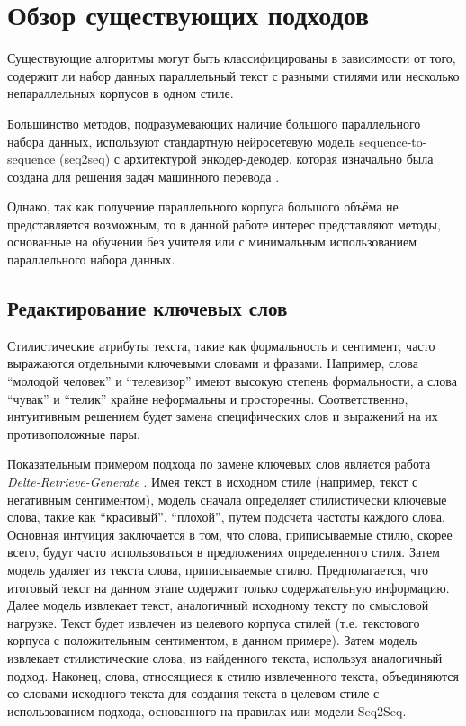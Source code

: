 \section{Обзор существующих подходов} \label{cha:analysis:sec:methods}
Существующие алгоритмы могут быть классифицированы в зависимости от того, содержит ли набор данных параллельный текст с разными стилями или несколько непараллельных корпусов в одном стиле.

Большинство методов, подразумевающих наличие большого параллельного набора данных, используют стандартную нейросетевую модель sequence-to-sequence (seq2seq) с архитектурой энкодер-декодер, которая изначально была создана для решения задач машинного перевода \cite{jin2021deep}.

Однако, так как получение параллельного корпуса большого объёма не представляется возможным, то в данной работе интерес представляют методы, основанные на обучении без учителя или с минимальным использованием параллельного набора данных.

\subsection{Редактирование ключевых слов}
Стилистические атрибуты текста, такие как формальность и сентимент, часто выражаются отдельными ключевыми словами и фразами.
Например, слова "`молодой человек"' и "`телевизор"' имеют высокую степень формальности, а слова "`чувак"' и "`телик"' крайне неформальны и просторечны.
Соответственно, интуитивным решением будет замена специфических слов и выражений на их противоположные пары.

Показательным примером подхода по замене ключевых слов является работа \textit{Delte-Retrieve-Generate} \cite{li2018delete}.
Имея текст в исходном стиле (например, текст с негативным сентиментом), модель сначала определяет стилистически ключевые слова, такие как "`красивый"', "`плохой"', путем подсчета частоты каждого слова.
Основная интуиция заключается в том, что слова, приписываемые стилю, скорее всего, будут часто использоваться в предложениях определенного стиля.
Затем модель удаляет из текста слова, приписываемые стилю.
Предполагается, что итоговый текст на данном этапе содержит только содержательную информацию.
Далее модель извлекает текст, аналогичный исходному тексту по смысловой нагрузке.
Текст будет извлечен из целевого корпуса стилей (т.е. текстового корпуса с положительным сентиментом, в данном примере).
Затем модель извлекает стилистические слова, из найденного текста, используя аналогичный подход.
Наконец, слова, относящиеся к стилю извлеченного текста, объединяются со словами исходного текста для создания текста в целевом стиле с использованием
подхода, основанного на правилах или модели Seq2Seq.

